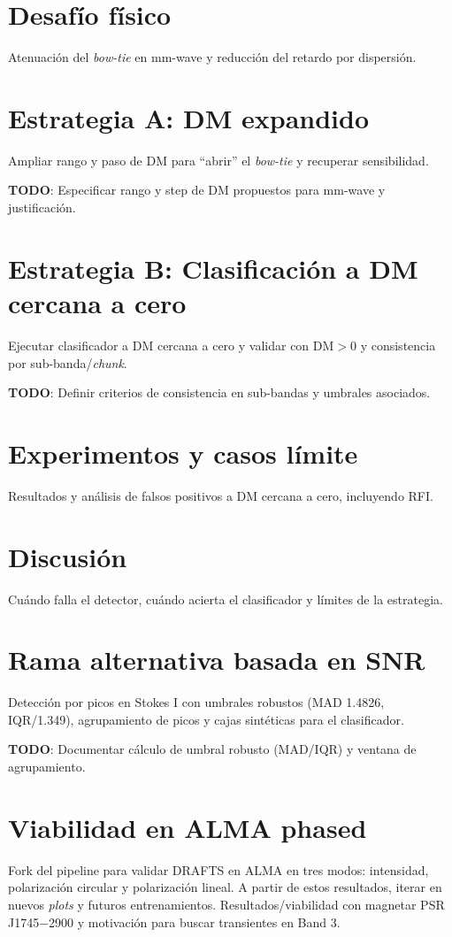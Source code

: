 
\section{Desafío físico}
Atenuación del \textit{bow-tie} en mm-wave y reducción del retardo por dispersión.

\section{Estrategia A: DM expandido}
Ampliar rango y paso de DM para ``abrir'' el \textit{bow-tie} y recuperar sensibilidad.

\textbf{TODO}: Especificar rango y step de DM propuestos para mm-wave y justificación.

\section{Estrategia B: Clasificación a DM cercana a cero}
Ejecutar clasificador a DM cercana a cero y validar con DM\(>0\) y consistencia por sub-banda/\textit{chunk}.

\textbf{TODO}: Definir criterios de consistencia en sub-bandas y umbrales asociados.

\section{Experimentos y casos límite}
Resultados y análisis de falsos positivos a DM cercana a cero, incluyendo RFI.

\section{Discusión}
Cuándo falla el detector, cuándo acierta el clasificador y límites de la estrategia.

\section{Rama alternativa basada en SNR}
Detección por picos en Stokes I con umbrales robustos (MAD 1.4826, IQR/1.349), agrupamiento de picos y cajas sintéticas para el clasificador.

\textbf{TODO}: Documentar cálculo de umbral robusto (MAD/IQR) y ventana de agrupamiento.

\section{Viabilidad en ALMA phased}
Fork del pipeline para validar DRAFTS en ALMA en tres modos: intensidad, polarización circular y polarización lineal. A partir de estos resultados, iterar en nuevos \textit{plots} y futuros entrenamientos. Resultados/viabilidad con magnetar PSR J1745−2900 y motivación para buscar transientes en Band 3.



